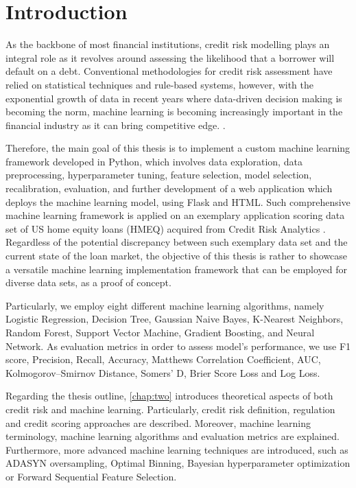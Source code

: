 \chapter{Introduction}
\label{chap:one}

As the backbone of most financial institutions, credit risk modelling plays an integral role as it  revolves around assessing the likelihood that a borrower will default on a debt.
Conventional methodologies for credit risk assessment have relied on statistical techniques and rule-based systems, however, with the exponential growth of data in recent years where data-driven decision making is becoming the norm, machine learning is becoming increasingly important in the financial industry as it can bring competitive edge. \citep{PwC2023}.


Therefore, the main goal of this thesis is to implement a custom machine learning framework developed in Python, which involves data exploration, data preprocessing, hyperparameter tuning, feature selection, model selection, recalibration, evaluation, and further development of a web application which deploys the machine learning model, using Flask and HTML.
Such comprehensive machine learning framework is applied on an exemplary application scoring data set of US home equity loans (HMEQ) acquired from Credit Risk Analytics \citep{baesens2016credit}.
Regardless of the potential discrepancy between such exemplary data set and the current state of the loan market, the objective of this thesis is rather to showcase a versatile machine learning implementation framework that can be  employed for diverse data sets, as a proof of concept.


Particularly, we employ eight different machine learning algorithms, namely Logistic Regression, Decision Tree, Gaussian Naive Bayes, K-Nearest Neighbors, Random Forest, Support Vector Machine, Gradient Boosting, and Neural Network.
As evaluation metrics in order to assess model's performance, we use F1 score, Precision, Recall, Accuracy, Matthews Correlation Coefficient, AUC, Kolmogorov--Smirnov Distance, Somers' D, Brier Score Loss and Log Loss.


Regarding the thesis outline, \autoref{chap:two} introduces theoretical aspects of both credit risk  and machine learning. Particularly, credit risk definition, regulation and credit scoring approaches are described. Moreover, machine learning terminology, machine learning algorithms and evaluation metrics are explained.
Furthermore, more advanced machine learning techniques are introduced, such as ADASYN oversampling, Optimal Binning, Bayesian hyperparameter optimization or Forward Sequential Feature Selection.

